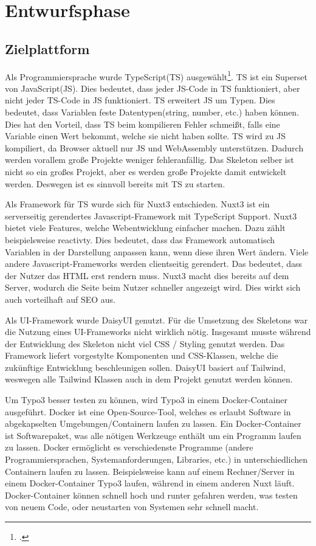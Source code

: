 \section{Entwurfsphase} 
\label{sec:Entwurfsphase}

\subsection{Zielplattform}
\label{sec:Zielplattform}

Als Programmiersprache wurde TypeScript(\acs{TS}) ausgewählt\footnote{\Vgl \citet{TypeScript}.}. \acs{TS} ist ein Superset von JavaScript(\acs{JS}). Dies bedeutet, dass jeder JS-Code in \acs{TS} funktioniert, aber nicht jeder \acs{TS}-Code in JS funktioniert. \acs{TS} erweitert JS um Typen. Dies bedeutet, dass Variablen feste Datentypen(string, number, etc.) haben können. Dies hat den Vorteil, dass \acs{TS} beim kompilieren Fehler schmeißt, falls eine Variable einen Wert bekommt, welche sie nicht haben sollte. \acs{TS} wird zu JS kompiliert, da Browser aktuell nur JS und WebAssembly unterstützen. Dadurch werden vorallem große Projekte weniger fehleranfällig. Das Skeleton selber ist nicht so ein großes Projekt, aber es werden große Projekte damit entwickelt werden. Deswegen ist es sinnvoll bereits mit \acs{TS} zu starten.

Als Framework für TS wurde sich für Nuxt3 entschieden. Nuxt3 ist ein serverseitig gerendertes Javascript-Framework mit TypeScript Support. Nuxt3 bietet viele Features, welche Webentwicklung einfacher machen. Dazu zählt beispielsweise reactivty. Dies bedeutet, dass das Framework automatisch Variablen in der Darstellung anpassen kann, wenn diese ihren Wert ändern. Viele andere Javascript-Frameworks werden clientseitig gerendert. Das bedeutet, dass der Nutzer das HTML erst rendern muss. Nuxt3 macht dies bereits auf dem Server, wodurch die Seite beim Nutzer schneller angezeigt wird. Dies wirkt sich auch vorteilhaft auf SEO aus.

Als UI-Framework wurde DaisyUI genutzt. Für die Umsetzung des Skeletons war die Nutzung eines UI-Frameworks nicht wirklich nötig. Insgesamt musste während der Entwicklung des Skeleton nicht viel CSS / Styling genutzt werden. Das Framework liefert vorgestylte Komponenten und CSS-Klassen, welche die zukünftige Entwicklung beschleunigen sollen. DaisyUI basiert auf Tailwind, weswegen alle Tailwind Klassen auch in dem Projekt genutzt werden können.

Um Typo3 besser testen zu können, wird Typo3 in einem Docker-Container ausgeführt. Docker ist eine Open-Source-Tool, welches es erlaubt Software in abgekapselten Umgebungen/Containern laufen zu lassen. Ein Docker-Container ist Softwarepaket, was alle nötigen Werkzeuge enthält um ein Programm laufen zu lassen. Docker ermöglicht es verschiedenste Programme (andere Programmiersprachen, Systemanforderungen, Libraries, etc.) in unterschiedlichen Containern laufen zu lassen. Beispielsweise kann auf einem Rechner/Server in einem Docker-Container Typo3 laufen, während in einem anderen Nuxt läuft. Docker-Container können schnell hoch und runter gefahren werden, was testen von neuem Code, oder neustarten von Systemen sehr schnell macht.


